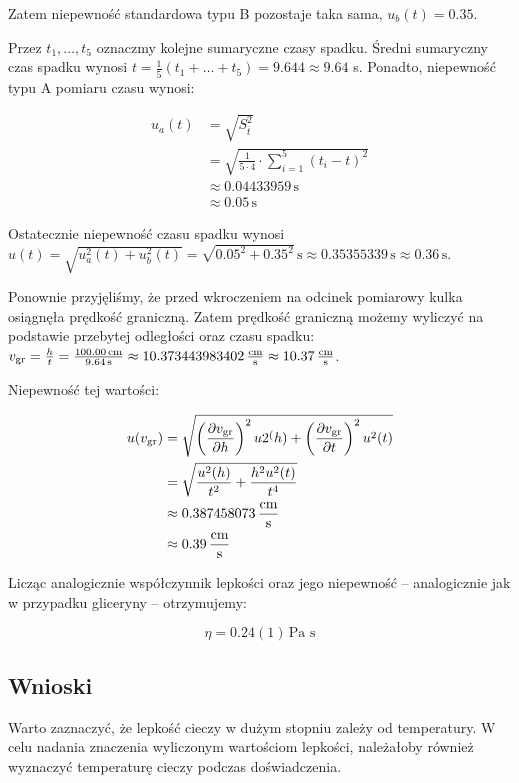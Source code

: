 \documentclass[a4paper]{article}
\newlength{\du}
\begin{document}
Zatem niepewność standardowa typu B pozostaje taka sama, $u_b(t) = 0.35$.

Przez $t_1, \dots, t_5$ oznaczmy kolejne sumaryczne czasy spadku.
Średni sumaryczny czas spadku wynosi $t = \frac 1 5 (t_1 + \dots + t_5) = 9.644 \approx 9.64$ s.
Ponadto, niepewność typu A pomiaru czasu wynosi:

\begin{align*}
	u_a(t) &= \sqrt{S^{2}_{\overline{t}}} \\
	&= \sqrt{\frac{1}{5 \cdot 4} \cdot \sum_{i=1}^{5} (t_i - t)^2} \\
	&\approx 0.04433959 \, \text{s} \\
	&\approx 0.05 \, \text{s}
\end{align*}

Ostatecznie niepewność czasu spadku wynosi $u(t) = \sqrt{u_a^2(t) + u_b^2(t)} = \sqrt{0.05^2 + 0.35^2} \, \text{s} \approx 0.35355339 \, \text{s} \approx 0.36\, \text{s}$.

Ponownie przyjęliśmy, że przed wkroczeniem na odcinek pomiarowy kulka osiągnęła prędkość graniczną.
Zatem prędkość graniczną możemy wyliczyć na podstawie przebytej odległości oraz czasu spadku:
$v_{\text{gr}} = \frac{h}{t} = \frac{100.00 \, \text{cm}}{9.64 \, \text{s}} \approx 10.373443983402 \, \frac{\text{cm}}{\text{s}} \approx 10.37 \, \frac{\text{cm}}{\text{s}}$.

Niepewność tej wartości:

\begin{align*}
	u(v_{\text{gr}}) &= \sqrt{\left(\frac{\partial v_{\text{gr}}}{\partial h}\right)^2 u2^(h) + \left(\frac{\partial v_{\text{gr}}}{\partial t}\right)^2 u^2(t)} \\
	&= \sqrt{\frac{u^2(h)}{t^2} + \frac{h^2 u^2(t)}{t^4}} \\
	&\approx 0.387458073 \, \frac{\text{cm}}{\text{s}} \\
	&\approx 0.39 \, \frac{\text{cm}}{\text{s}}
\end{align*}

Licząc analogicznie współczynnik lepkości oraz jego niepewność -- analogicznie jak w przypadku gliceryny -- otrzymujemy:

$$
\eta = 0.24 (1) \, \text{Pa s}
$$

\subsection{Wnioski}

Warto zaznaczyć, że lepkość cieczy w dużym stopniu zależy od temperatury.
W celu nadania znaczenia wyliczonym wartościom lepkości, należałoby również wyznaczyć temperaturę cieczy podczas doświadczenia.
\end{document}
